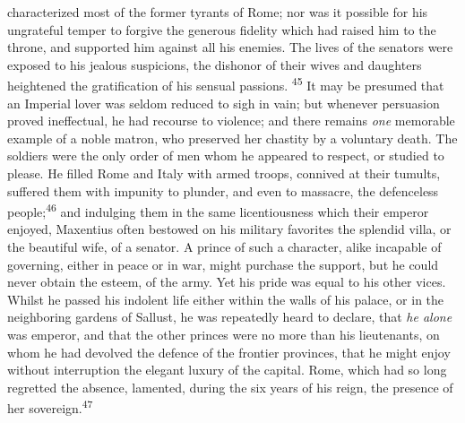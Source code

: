 characterized most of the former tyrants of Rome; nor was it
possible for his ungrateful temper to forgive the generous
fidelity which had raised him to the throne, and supported him
against all his enemies. The lives of the senators were exposed
to his jealous suspicions, the dishonor of their wives and
daughters heightened the gratification of his sensual passions. \textsuperscript{45}
It may be presumed that an Imperial lover was seldom reduced
to sigh in vain; but whenever persuasion proved ineffectual, he
had recourse to violence; and there remains \textit{one} memorable
example of a noble matron, who preserved her chastity by a
voluntary death. The soldiers were the only order of men whom he
appeared to respect, or studied to please. He filled Rome and
Italy with armed troops, connived at their tumults, suffered them
with impunity to plunder, and even to massacre, the defenceless
people;\textsuperscript{46} and indulging them in the same licentiousness which
their emperor enjoyed, Maxentius often bestowed on his military
favorites the splendid villa, or the beautiful wife, of a
senator. A prince of such a character, alike incapable of
governing, either in peace or in war, might purchase the support,
but he could never obtain the esteem, of the army. Yet his pride
was equal to his other vices. Whilst he passed his indolent life
either within the walls of his palace, or in the neighboring
gardens of Sallust, he was repeatedly heard to declare, that \textit{he
alone} was emperor, and that the other princes were no more than
his lieutenants, on whom he had devolved the defence of the
frontier provinces, that he might enjoy without interruption the
elegant luxury of the capital. Rome, which had so long regretted
the absence, lamented, during the six years of his reign, the
presence of her sovereign.\textsuperscript{47}





